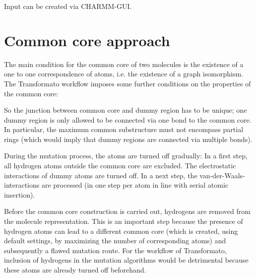 Input can be created via CHARMM-GUI\cite{Jo.2008}\cite{Braunsfeld.}.

\section{Common core approach}

The main condition for the common core of two molecules is the existence
of a one to one correspondence of atoms, i.e. the existence of a graph
isomorphism. The Transformato workflow imposes some further conditions
on the properties of the common core:

So the junction between common core and dummy region has to be unique;
one dummy region is only allowed to be connected via one bond to the
common core. In particular, the maximum common substructure must not
encompass partial rings (which would imply that dummy regions are
connected via multiple bonds).

During the mutation process, the atoms are turned off gradually: In
a first step, all hydrogen atoms outside the common core are excluded.
The electrostatic interactions of dummy atoms are turned off. In a
next step, the van-der-Waals-interactions are processed (in one step
per atom in line with serial atomic insertion). 

Before the common core construction is carried out, hydrogens are
removed from the molecule representation. This is an important step
because the presence of hydrogen atoms can lead to a different common
core (which is created, using default settings, by maximizing the
number of corresponding atoms) and subsequently a flawed mutation
route. For the workflow of Transformato, inclusion of hydrogens in
the mutation algorithms would be detrimental because these atoms are
already turned off beforehand.
